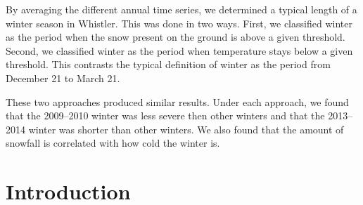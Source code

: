 \documentclass[12pt,twoside]{article}
\begin{document}
By averaging the different annual time series, we determined a typical length of a winter season in Whistler. This was done in two ways. First, we classified winter as the period when the snow present on the ground is above a given threshold. Second, we classified winter as the period when temperature stays below a given threshold. This contrasts the typical definition of winter as the period from December 21 to March 21.

These two approaches produced similar results. Under each approach, we found that the 2009--2010 winter was less severe then other winters and that the 2013--2014 winter was shorter than other winters. We also found that the amount of snowfall is correlated with how cold the winter is.

\pagebreak

\section{Introduction}
\end{document}
